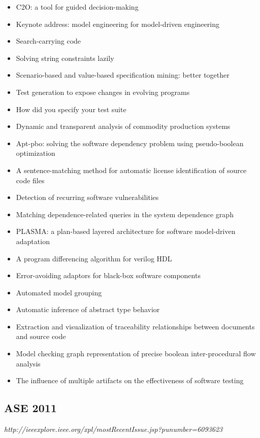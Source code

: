 {\begin{itemize}[itemsep=-1ex]
  \item C2O: a tool for guided decision-making
  \item Keynote address: model engineering for model-driven engineering
  \item Search-carrying code
  \item Solving string constraints lazily
  \item Scenario-based and value-based specification mining: better together
  \item Test generation to expose changes in evolving programs
  \item How did you specify your test suite
  \item Dynamic and transparent analysis of commodity production systems
  \item Apt-pbo: solving the software dependency problem using pseudo-boolean optimization
  \item A sentence-matching method for automatic license identification of source code files
  \item Detection of recurring software vulnerabilities
  \item Matching dependence-related queries in the system dependence graph
  \item PLASMA: a plan-based layered architecture for software model-driven adaptation
  \item A program differencing algorithm for verilog HDL
  \item Error-avoiding adaptors for black-box software components
  \item Automated model grouping
  \item Automatic inference of abstract type behavior
  \item Extraction and visualization of traceability relationships between documents and source code
  \item Model checking graph representation of precise boolean inter-procedural flow analysis
  \item The influence of multiple artifacts on the effectiveness of software testing
\end{itemize}
}

\subsection{ASE 2011}

{\small \em http://ieeexplore.ieee.org/xpl/mostRecentIssue.jsp?punumber=6093623}

